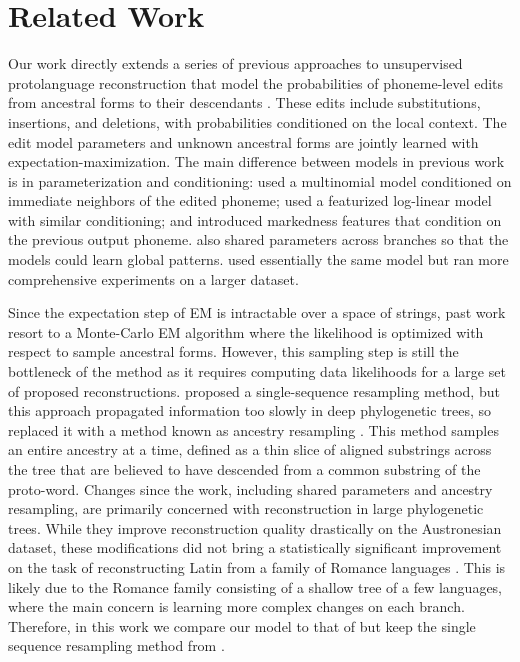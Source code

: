 \documentclass[11pt]{article}
\begin{document}
\section{Related Work}
\label{sec:relatedwork}

Our work directly extends a series of previous approaches to unsupervised protolanguage reconstruction that model the probabilities of phoneme-level edits from ancestral forms to their descendants \citep{bouchard-etal-2007-probabilistic, NIPS2007_7ce3284b, bouchard-cote-etal-2009-improved, doi:10.1073/pnas.1204678110}. 
These edits include substitutions, insertions, and deletions, with probabilities conditioned on the local context. The edit model parameters and unknown ancestral forms are jointly learned with expectation-maximization. 
The main difference between models in previous work is in parameterization and conditioning: \citet{bouchard-etal-2007-probabilistic} used a multinomial model conditioned on immediate neighbors of the edited phoneme; \citet{NIPS2007_7ce3284b} used a featurized log-linear model with similar conditioning; and \citet{bouchard-cote-etal-2009-improved} introduced markedness features that condition on the previous output phoneme. \citet{bouchard-cote-etal-2009-improved} also shared parameters across branches so that the models could learn global patterns. \citet{doi:10.1073/pnas.1204678110} used essentially the same model but ran more comprehensive experiments on a larger dataset. 

Since the expectation step of EM is intractable over a space of strings, past work resort to a Monte-Carlo EM algorithm where the likelihood is optimized with respect to sample ancestral forms. However, this sampling step is still the bottleneck of the method as it requires computing data likelihoods for a large set of proposed reconstructions. \citet{bouchard-etal-2007-probabilistic} proposed a single-sequence resampling method, but this approach propagated information too slowly in deep phylogenetic trees, so \citet{bouchard-cote-etal-2009-improved} replaced it with a method known as ancestry resampling \citep{NIPS2008_1651cf0d}. This method samples an entire ancestry at a time, defined as a thin slice of aligned substrings across the tree that are believed to have descended from a common substring of the proto-word. 
Changes since the \citet{bouchard-cote-etal-2009-improved} work, including shared parameters and ancestry resampling, are primarily concerned with reconstruction in large phylogenetic trees. While they improve reconstruction quality drastically on the Austronesian dataset, these modifications did not bring a statistically significant improvement on the task of reconstructing Latin from a family of Romance languages \citep{bouchard-cote-etal-2009-improved}. This is likely due to the Romance family consisting of a shallow tree of a few languages, where the main concern is learning more complex changes on each branch. Therefore, in this work we compare our model to that of \citet{bouchard-cote-etal-2009-improved} but keep the single sequence resampling method from \citet{bouchard-etal-2007-probabilistic}. 
\end{document}
